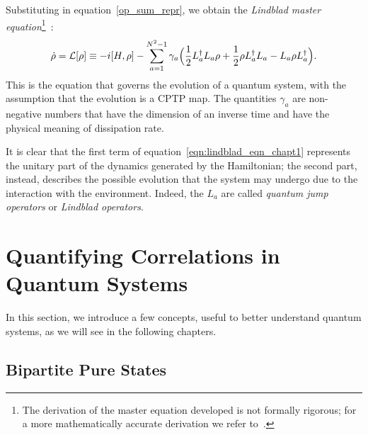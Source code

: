 Substituting in equation~\ref{op_sum_repr}, we obtain the \emph{Lindblad master equation}\footnote{The derivation of the master equation developed is not formally rigorous; for a more mathematically accurate derivation we refer to~\cite{pet_breuer:open_quantum}.}~\cite{presk:quant_info}:
\begin{equation}
\label{eqn:lindblad_eqn_chapt1}
    \dot{\rho} = \mathcal{L}[\rho] \equiv -i[H, \rho] - \sum_{a=1}^{N^2-1} \gamma_a \Bigl(\frac{1}{2}L_a^{\dagger}L_a\rho + \frac{1}{2}\rho L_a^{\dagger}L_a - L_a\rho L_a^{\dagger}\Bigl).
\end{equation}
This is the equation that governs the evolution of a quantum system, with the assumption that the evolution is a CPTP map. The quantities $\gamma_a$ are non-negative numbers that have the dimension of an inverse time and have the physical meaning of dissipation rate.

It is clear that the first term of equation~\ref{eqn:lindblad_eqn_chapt1} represents the unitary part of the dynamics generated by the Hamiltonian; the second part, instead, describes the possible evolution that the system may undergo due to the interaction with the environment. Indeed, the $L_a$ are called \emph{quantum jump operators} or \emph{Lindblad operators}.



\section{Quantifying Correlations in Quantum Systems}
\label{many_body_oqs}
In this section, we introduce a few concepts, useful to better understand quantum systems, as we will see in the following chapters.

\subsection{Bipartite Pure States}

